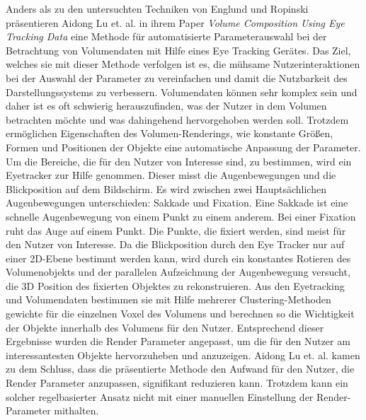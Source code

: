 Anders als zu den untersuchten Techniken von Englund und Ropinski \cite{doi:10.1111/cgf.13320} präsentieren Aidong Lu et. al. in ihrem Paper \emph{Volume Composition Using Eye Tracking Data} \cite{Lu:2006:VCU:2384796.2384814} eine Methode für automatisierte Parameterauswahl bei der Betrachtung von Volumendaten mit Hilfe eines Eye Tracking Gerätes.
Das Ziel, welches sie mit dieser Methode verfolgen ist es, die mühsame Nutzerinteraktionen bei der Auswahl der Parameter zu vereinfachen und damit die Nutzbarkeit des Darstellungssystems zu verbessern.
Volumendaten können sehr komplex sein und daher ist es oft schwierig herauszufinden, was der Nutzer in dem Volumen betrachten möchte und was dahingehend hervorgehoben werden soll.
Trotzdem ermöglichen Eigenschaften des Volumen-Renderings, wie konstante Größen, Formen und Positionen der Objekte eine automatische Anpassung der Parameter.
Um die Bereiche, die für den Nutzer von Interesse sind, zu bestimmen, wird ein Eyetracker zur Hilfe genommen.
Dieser misst die Augenbewegungen und die Blickposition auf dem Bildschirm.
Es wird zwischen zwei Hauptsächlichen Augenbewegungen unterschieden: Sakkade und Fixation.
Eine Sakkade ist eine schnelle Augenbewegung von einem Punkt zu einem anderem.
Bei einer Fixation ruht das Auge auf einem Punkt.
Die Punkte, die fixiert werden, sind meist für den Nutzer von Interesse.
Da die Blickposition durch den Eye Tracker nur auf einer 2D-Ebene bestimmt werden kann, wird durch ein konstantes Rotieren des Volumenobjekts und der parallelen Aufzeichnung der Augenbewegung versucht, die 3D Position des fixierten Objektes zu rekonstruieren.
Aus den Eyetracking und Volumendaten bestimmen sie mit Hilfe mehrerer Clustering-Methoden gewichte für die einzelnen Voxel des Volumens und berechnen so die Wichtigkeit der Objekte innerhalb des Volumens für den Nutzer.
Entsprechend dieser Ergebnisse wurden die Render Parameter angepasst, um die für den Nutzer am interessantesten Objekte hervorzuheben und anzuzeigen.
Aidong Lu et. al. kamen zu dem Schluss, dass die präsentierte Methode den Aufwand für den Nutzer, die Render Parameter anzupassen, signifikant reduzieren kann.
Trotzdem kann ein solcher regelbasierter Ansatz nicht mit einer manuellen Einstellung der Render-Parameter mithalten.

